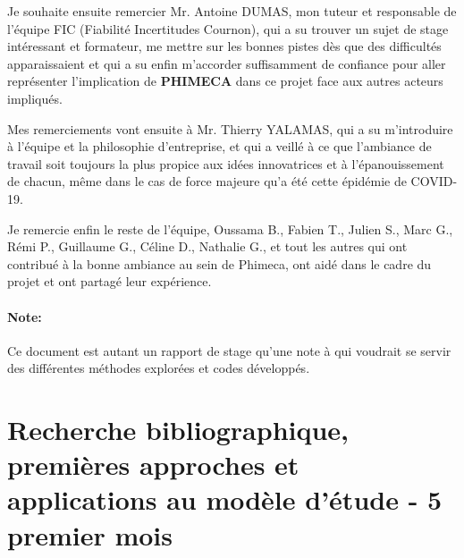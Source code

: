 \documentclass[a4paper,10pt]{article}
\begin{document}
Je souhaite ensuite remercier Mr. Antoine DUMAS, mon tuteur et responsable de l'équipe FIC (Fiabilité Incertitudes Cournon), qui a su trouver un sujet de stage intéressant et formateur, me mettre sur les bonnes pistes dès que des difficultés apparaissaient et qui a su enfin m'accorder suffisamment de confiance pour aller représenter l'implication de \textbf{PHIMECA} dans ce projet face aux autres acteurs impliqués. \bigskip

Mes remerciements vont ensuite à Mr. Thierry YALAMAS, qui a su m'introduire à l'équipe et la philosophie d'entreprise, et qui a veillé à ce que l'ambiance de travail soit toujours la plus propice aux idées innovatrices et à l'épanouissement de chacun, même dans le cas de force majeure qu'a été cette épidémie de COVID-19. \bigskip

Je remercie enfin le reste de l'équipe, Oussama B., Fabien T., Julien S., Marc G., Rémi P., Guillaume G., Céline D., Nathalie G., et tout les autres qui ont contribué à la bonne ambiance au sein de Phimeca, ont aidé dans le cadre du projet et ont partagé leur expérience. 

\paragraph{Note:}
Ce document est autant un rapport de stage qu'une note à qui voudrait se servir des différentes méthodes explorées et codes développés.

\newpage
\section{Recherche bibliographique, premières approches et applications au modèle d'étude - 5 premier mois}
\end{document}
